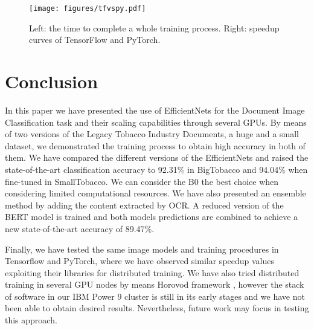 \documentclass[runningheads]{llncs}
\begin{document}
\begin{figure}
	\begin{centering}
	\texttt{[image: figures/tfvspy.pdf]}
	\caption{Left: the time to complete a whole training process. Right: speedup curves of TensorFlow and PyTorch.}
	\label{fig:tfvspy}
	\end{centering}
\end{figure}

\begin{comment}
\begin{figure}
	\begin{centering}
	\texttt{[image: figures/tfspeedup.pdf]}
	\caption{Tensorflow vs PyTorch speedup.}
	\label{fig:tfvspy_speedup}
	\end{centering}
	\vspace{-5mm}
\end{figure}
\end{comment}

\section{Conclusion}
In this paper we have presented the use of EfficientNets for the Document Image Classification task and their scaling capabilities through several GPUs. By means of two versions of the Legacy Tobacco Industry Documents, a huge and a small dataset, we demonstrated the training process to obtain high accuracy in both of them. 
We have compared the different versions of the EfficientNets and raised the state-of-the-art classification accuracy to 92.31\% in BigTobacco and 94.04\% when fine-tuned in SmallTobacco. We can consider the B0 the best choice when considering limited computational resources.
We have also presented an ensemble method by adding the content extracted by OCR. A reduced version of the BERT model is trained and both models predictions are combined to achieve a new state-of-the-art accuracy of 89.47\%.

Finally, we have tested the same image models and training procedures in Tensorflow and PyTorch, where we have observed similar speedup values exploiting their libraries for distributed training. We have also tried distributed training in several GPU nodes by means Horovod framework \cite{sergeev2018horovod}, however the stack of software in our IBM Power 9 cluster is still in its early stages and we have not been able to obtain desired results. Nevertheless, future work may focus in testing this approach.
\end{document}
